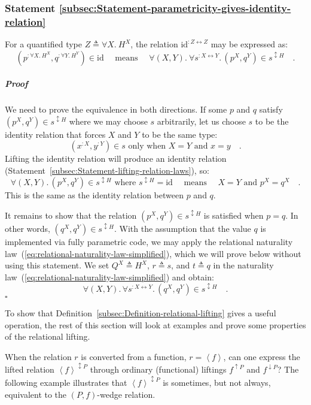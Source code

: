 \subsubsection{Statement \label{subsec:Statement-parametricity-gives-identity-relation}\ref{subsec:Statement-parametricity-gives-identity-relation}}

For a quantified type $Z\triangleq\forall X.\ H^{X}$, the relation
$\text{id}^{:Z\leftrightarrow Z}$ may be expressed as:
\[
(p^{:\forall X.\ H^{X}},q^{:\forall Y.\ H^{Y}})\in\text{id}\quad\text{ means }\quad\forall(X,Y).\:\forall s^{:X\leftrightarrow Y}.\,(p^{X},q^{Y})\in s^{\updownarrow H}\quad.
\]


\subparagraph{Proof}

We need to prove the equivalence in both directions. If some $p$
and $q$ satisfy $(p^{X},q^{Y})\in s^{\updownarrow H}$ where we may
choose $s$ arbitrarily, let us choose $s$ to be the identity relation
that forces $X$ and $Y$ to be the same type:
\[
(x^{:X},y^{:Y})\in s\text{ only when }X=Y\text{ and }x=y\quad.
\]
Lifting the identity relation will produce an identity relation (Statement~\ref{subsec:Statement-lifting-relation-laws}),
so:
\[
\forall(X,Y).\,(p^{X},q^{Y})\in s^{\updownarrow H}\text{ where }s^{\updownarrow H}=\text{id}\quad\text{ means }\quad X=Y\text{ and }p^{X}=q^{X}\quad.
\]
This is the same as the identity relation between $p$ and $q$.

It remains to show that the relation $(p^{X},q^{Y})\in s^{\updownarrow H}$
is satisfied when $p=q$. In other words, $(q^{X},q^{Y})\in s^{\updownarrow H}$.
With the assumption that the value $q$ is implemented via fully parametric
code, we may apply the relational naturality law~(\ref{eq:relational-naturality-law-simplified}),
which we will prove below without using this statement. We set $Q^{X}\triangleq H^{X}$,
$r\triangleq s$, and $t\triangleq q$ in the naturality law~(\ref{eq:relational-naturality-law-simplified})
and obtain:
\[
\forall(X,Y).\,\forall s^{:X\leftrightarrow Y}.\,(q^{X},q^{Y})\in s^{\updownarrow H}\quad.
\]
$\square$

To show that Definition~\ref{subsec:Definition-relational-lifting}
gives a useful operation, the rest of this section will look at examples
and prove some properties of the relational lifting.

When the relation $r$ is converted from a function, $r=\left<f\right>$,
can one express the lifted relation $\left<f\right>^{\updownarrow P}$
through ordinary (functional) liftings $f^{\uparrow P}$ and $f^{\downarrow P}$?
The following example illustrates that $\left<f\right>^{\updownarrow P}$
is sometimes, but not always, equivalent to the $\left(P,f\right)$-wedge
relation.


